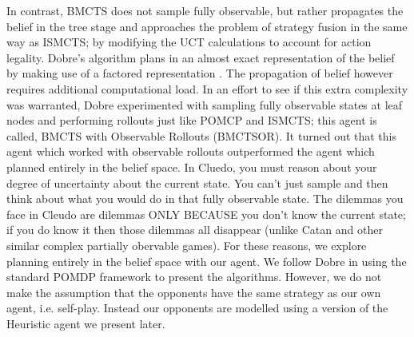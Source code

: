 \documentclass[msc, deptreport, ai, romanprepages]{infthesis}
\begin{document}
In contrast, BMCTS does not sample fully observable, but rather propagates the belief in the tree stage and approaches the problem of strategy fusion in the same way as ISMCTS; by modifying the UCT calculations to account for action legality. Dobre’s algorithm plans in an almost exact representation of the belief by making use of a factored representation \cite{Mihai}. The propagation of belief however requires additional computational load. In an effort to see if this extra complexity was warranted, Dobre experimented with sampling fully observable states at leaf nodes and performing rollouts just like POMCP and ISMCTS; this agent is called, BMCTS with Observable Rollouts (BMCTSOR). It turned out that this agent which worked with observable rollouts outperformed the agent which planned entirely in the belief space. In Cluedo, you must reason about your degree of uncertainty about the current state. You can't just sample and then think about what you would do in that fully observable state. The dilemmas you face in Cleudo are dilemmas ONLY BECAUSE you don't know the current state; if you do know it then those dilemmas all disappear (unlike Catan and other similar complex partially obervable games). For these reasons, we explore planning entirely in the belief space with our agent. We follow Dobre in using the standard POMDP framework to present the algorithms. However, we do not make the assumption that the opponents have the same strategy as our own agent, i.e. self-play. Instead our opponents are modelled using a version of the Heuristic agent we present later.
\end{document}
